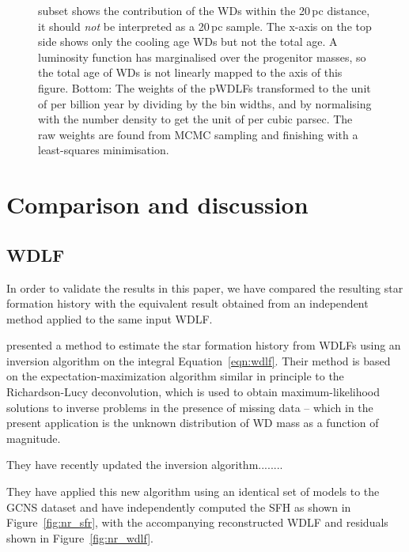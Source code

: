 \documentclass[fleqn,usenatbib]{mnras}
\begin{document}
\begin{figure}
{    subset shows the contribution of the WDs within the 20\,pc distance, it
    should \textit{not} be interpreted as a 20\,pc sample. The x-axis on
    the top side shows only the cooling age WDs but not the total age. A
    luminosity function has marginalised over the progenitor masses, so the total
    age of WDs is not linearly mapped to the axis of this figure. Bottom: The
    weights of the pWDLFs transformed to the unit of per billion year by dividing
    by the bin widths, and by normalising with the number density to get the
    unit of per cubic parsec. The raw weights are found from MCMC sampling
    and finishing with a least-squares minimisation.}
    \label{fig:sfh_optimal}
\end{figure}


\section{Comparison and discussion}
\label{sec:comparison}

\subsection{WDLF}
\label{sec:inversion}
In order to validate the results in this paper, we have compared the
resulting star formation history with the equivalent result obtained from an
independent method applied to the same input WDLF.

\citet{2013MNRAS.434.1549R} presented a method to estimate the star formation
history from WDLFs using an inversion algorithm on the integral 
Equation~\ref{eqn:wdlf}. Their method is based on the expectation-maximization
algorithm similar in principle to the Richardson-Lucy deconvolution, which is
used to obtain maximum-likelihood solutions to inverse problems in the presence 
of missing data -- which in the present application is the unknown distribution
of WD mass as a function of magnitude.

They have recently updated the inversion algorithm........

They have applied this new algorithm using an identical set of models to the
GCNS dataset and have independently computed the SFH as shown in
Figure~\ref{fig:nr_sfr}, with the accompanying reconstructed WDLF and residuals
shown in Figure~\ref{fig:nr_wdlf}.
\end{document}
